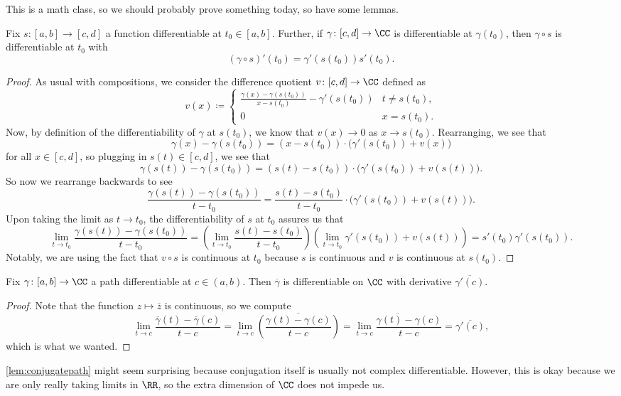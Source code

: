 \documentclass[../notes.tex]{subfiles}
\begin{document}
This is a math class, so we should probably prove something today, so have some lemmas.
\begin{lemma} \label{lem:reparameterize}
	Fix $s\colon [a,b]\to[c,d]$ a function differentiable at $t_0\in[a,b]$. Further, if $\gamma\colon [c,d]\to\CC$ is differentiable at $\gamma(t_0)$, then $\gamma\circ s$ is differentiable at $t_0$ with
	\[(\gamma\circ s)'(t_0)=\gamma'(s(t_0))s'(t_0).\]
\end{lemma}
\begin{proof}
	As usual with compositions, we consider the difference quotient $v\colon [c,d]\to\CC$ defined as
	\[v(x)\coloneqq \begin{cases}
		\frac{\gamma(x)-\gamma(s(t_0))}{x-s(t_0)}-\gamma'(s(t_0)) & t\ne s(t_0), \\
		0 & x=s(t_0).
	\end{cases}\]
	Now, by definition of the differentiability of $\gamma$ at $s(t_0)$, we know that $v(x)\to0$ as $x\to s(t_0)$. Rearranging, we see that
	\[\gamma(x)-\gamma(s(t_0))=(x-s(t_0))\cdot\big(\gamma'(s(t_0))+v(x)\big)\]
	for all $x\in [c,d]$, so plugging in $s(t)\in[c,d]$, we see that
	\[\gamma(s(t))-\gamma(s(t_0))=(s(t)-s(t_0))\cdot\big(\gamma'(s(t_0))+v(s(t))\big).\]
	So now we rearrange backwards to see
	\[\frac{\gamma(s(t))-\gamma(s(t_0))}{t-t_0}=\frac{s(t)-s(t_0)}{t-t_0}\cdot\big(\gamma'(s(t_0))+v(s(t))\big).\]
	Upon taking the limit as $t\to t_0$, the differentiability of $s$ at $t_0$ assures us that
	\[\lim_{t\to t_0}\frac{\gamma(s(t))-\gamma(s(t_0))}{t-t_0}=\left(\lim_{t\to t_0}\frac{s(t)-s(t_0)}{t-t_0}\right)\left(\lim_{t\to t_0}\gamma'(s(t_0))+v(s(t))\right)=s'(t_0)\gamma'(s(t_0)).\]
	Notably, we are using the fact that $v\circ s$ is continuous at $t_0$ because $s$ is continuous and $v$ is continuous at $s(t_0)$.
\end{proof}
\begin{lemma} \label{lem:conjugatepath}
	Fix $\gamma\colon [a,b]\to\CC$ a path differentiable at $c\in(a,b)$. Then $\overline{\gamma}$ is differentiable on $\CC$ with derivative $\overline{\gamma'(c)}$.
\end{lemma}
\begin{proof}
	Note that the function $z\mapsto\overline z$ is continuous, so we compute
	\[\lim_{t\to c}\frac{\overline\gamma(t)-\overline\gamma(c)}{t-c}=\lim_{t\to c}\overline{\left(\frac{\gamma(t)-\gamma(c)}{t-c}\right)}=\overline{\lim_{t\to c}\frac{\gamma(t)-\gamma(c)}{t-c}}=\overline{\gamma'(c)},\]
	which is what we wanted.
\end{proof}
\begin{remark}
	\autoref{lem:conjugatepath} might seem surprising because conjugation itself is usually not complex differentiable. However, this is okay because we are only really taking limits in $\RR$, so the extra dimension of $\CC$ does not impede us.
\end{remark}
\end{document}

